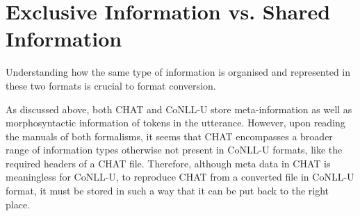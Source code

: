 



\section{Exclusive Information vs. Shared Information}
Understanding how the same type of information is organised and represented in these two formats is crucial to format conversion.

As discussed above, both CHAT and CoNLL-U store meta-information as well as morphosyntactic information of tokens in the utterance. However, upon reading the manuals of both formalisms, it seems that CHAT encompasses a broader range of information types otherwise not present in CoNLL-U formats, like the required headers of a CHAT file. Therefore, although meta data in CHAT is meaningless for CoNLL-U, to reproduce CHAT from a converted file in CoNLL-U format, it must be stored in such a way that it can be put back to the right place.
\clearpage

